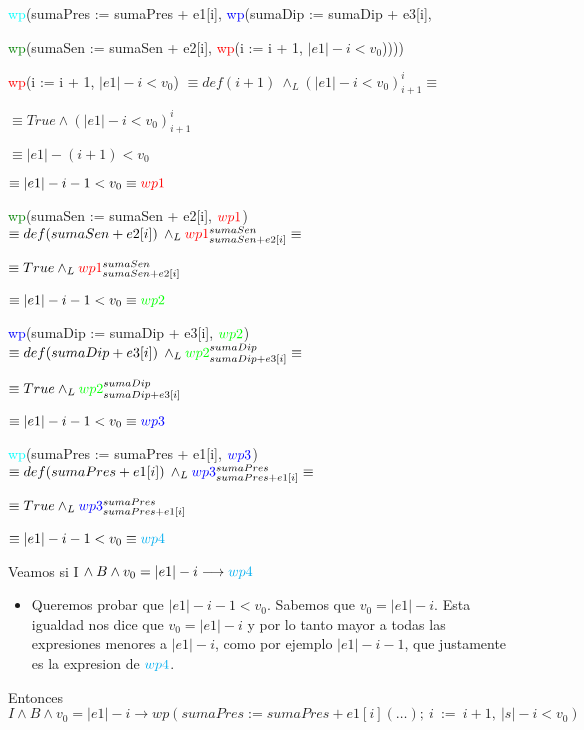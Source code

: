\documentclass[10pt,a4paper]{article}
\begin{document}
\begin{enumerate}
\begin{enumerate}
\quad\quad \textcolor{cyan}{wp}(sumaPres := sumaPres + e1[i], \textcolor{blue}{wp}(sumaDip := sumaDip + e3[i],

\quad\quad \textcolor{green}{wp}(sumaSen := sumaSen + e2[i], \textcolor{red}{wp}(i := i + 1, $|e1| - i < v_0$))))

\quad\quad\quad \textcolor{red}{wp}(i := i + 1, $|e1| - i < v_0$) $\equiv def(i+1) \: \land_{L} (|e1| - i < v_0)^i_{i+1} \equiv$

\quad\quad\quad $\equiv True \land (|e1| - i < v_0)^i_{i+1}$

\quad\quad\quad $\equiv |e1| - (i+1) < v_0$

\quad\quad\quad $\equiv |e1| - i - 1 < v_0 \equiv \textcolor{red}{wp1}$

\quad\quad\quad \textcolor{green}{wp}(sumaSen := sumaSen + e2[i], $\textcolor{red}{wp1}$) $\equiv def(sumaSen + e2[i]) \: \land_{L} \textcolor{red}{wp1}^{sumaSen}_{sumaSen + e2[i]} \equiv$

\quad\quad\quad $\equiv True \land_L \textcolor{red}{wp1}^{sumaSen}_{sumaSen + e2[i]}$

\quad\quad\quad $\equiv |e1| - i - 1 < v_0 \equiv \textcolor{green}{wp2}$

\quad\quad\quad \textcolor{blue}{wp}(sumaDip := sumaDip + e3[i], $\textcolor{green}{wp2}$) $\equiv def(sumaDip + e3[i]) \: \land_{L} \textcolor{green}{wp2}^{sumaDip}_{sumaDip + e3[i]} \equiv$

\quad\quad\quad $\equiv True \land_L \textcolor{green}{wp2}^{sumaDip}_{sumaDip + e3[i]}$

\quad\quad\quad $\equiv |e1| - i - 1 < v_0 \equiv \textcolor{blue}{wp3}$

\quad\quad\quad \textcolor{cyan}{wp}(sumaPres := sumaPres + e1[i], $\textcolor{blue}{wp3}$) $\equiv def(sumaPres + e1[i]) \: \land_{L} \textcolor{blue}{wp3}^{sumaPres}_{sumaPres + e1[i]} \equiv$

\quad\quad\quad $\equiv True \land_L \textcolor{blue}{wp3}^{sumaPres}_{sumaPres + e1[i]}$

\quad\quad\quad $\equiv |e1| - i - 1 < v_0 \equiv \textcolor{cyan}{wp4}$

Veamos si I $\land \: B \land v_0 = |e1| - i \longrightarrow \textcolor{cyan}{wp4}$
\begin{itemize}
    \item Queremos probar que $|e1| - i - 1 < v_0$. Sabemos que $v_0 = |e1| - i$. Esta igualdad nos dice que $v_0 = |e1| - i$ y por lo tanto mayor a todas las expresiones menores a $|e1| - i$, como por ejemplo $|e1| - i - 1$, que justamente es la expresion de $\textcolor{cyan}{wp4}$.
\end{itemize}
Entonces $I \land B \land v_0 = |e1| - i \longrightarrow wp(sumaPres := sumaPres + e1[i](\ldots);\: i \: := \: i + 1, \: |s| - i < v_0)$
\end{enumerate}
\end{enumerate}
\end{document}
